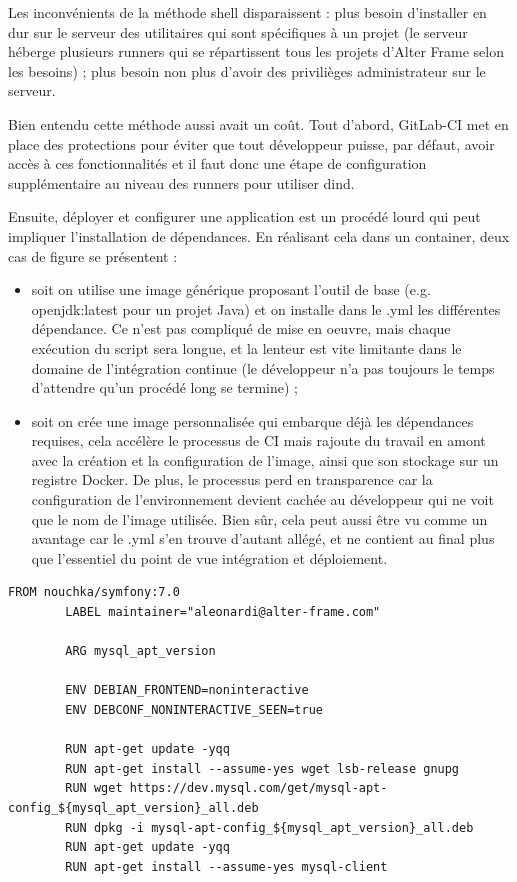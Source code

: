 Les inconvénients de la méthode shell disparaissent : plus besoin d'installer en dur sur le serveur des utilitaires qui sont spécifiques à un projet (le serveur héberge plusieurs runners qui se répartissent tous les projets d'Alter Frame selon les besoins) ; plus besoin non plus d'avoir des privilièges administrateur sur le serveur.

Bien entendu cette méthode aussi avait un coût. Tout d'abord, GitLab-CI met en place des protections pour éviter que tout développeur puisse, par défaut, avoir accès à ces fonctionnalités et il faut donc une étape de configuration supplémentaire au niveau des runners pour utiliser dind.

Ensuite, déployer et configurer une application est un procédé lourd qui peut impliquer l'installation de dépendances. En réalisant cela dans un container, deux cas de figure se présentent :
\begin{itemize}[label=$\bullet$]
\item soit on utilise une image générique proposant l'outil de base (e.g. openjdk:latest pour un projet Java) et on installe dans le .yml les différentes dépendance. Ce n'est pas compliqué de mise en oeuvre, mais chaque exécution du script sera longue, et la lenteur est vite limitante dans le domaine de l'intégration continue (le développeur n'a pas toujours le temps d'attendre qu'un procédé long se termine) ;
\item soit on crée une image personnalisée qui embarque déjà les dépendances requises, cela accélère le processus de CI mais rajoute du travail en amont avec la création et la configuration de l'image, ainsi que son stockage sur un registre Docker. De plus, le processus perd en transparence car la configuration de l'environnement devient cachée au développeur qui ne voit que le nom de l'image utilisée. Bien sûr, cela peut aussi être vu comme un avantage car le .yml s'en trouve d'autant allégé, et ne contient au final plus que l'essentiel du point de vue intégration et déploiement. 
\end{itemize}
\begin{minipage}{\linewidth}
	\begin{lstlisting}[caption={Dockerfile utilisé pour le job de déploiement de l'application},label={lst:dockerfile}]
		FROM nouchka/symfony:7.0
		LABEL maintainer="aleonardi@alter-frame.com"
		
		ARG mysql_apt_version
		
		ENV DEBIAN_FRONTEND=noninteractive
		ENV DEBCONF_NONINTERACTIVE_SEEN=true
		
		RUN apt-get update -yqq
		RUN apt-get install --assume-yes wget lsb-release gnupg
		RUN wget https://dev.mysql.com/get/mysql-apt-config_${mysql_apt_version}_all.deb
		RUN dpkg -i mysql-apt-config_${mysql_apt_version}_all.deb
		RUN apt-get update -yqq
		RUN apt-get install --assume-yes mysql-client		
\end{lstlisting}
\end{minipage}

